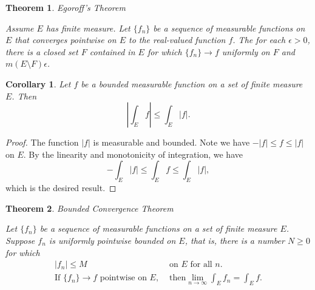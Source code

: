\documentclass[12pt]{amsart}
\theoremstyle{plain}
\newtheorem{thm}{Theorem}[section]
\newtheorem{cor}{Corollary}[thm]
\theoremstyle{definition}
\theoremstyle{remark}
\numberwithin{equation}{section}
\numberwithin{thm}{section}
\begin{document}
\begin{thm}{Egoroff's Theorem}\label{thm:Egoroff} %

    Assume $E$ has finite measure. Let $\{f_n\}$ be a sequence of measurable functions on $E$ that converges pointwise on $E$ to the real-valued function $f$. The for each $\epsilon>0$, there is a closed set $F$ contained in $E$ for which
    $\{f_n\} \to f$ uniformly on $F$ and $m(E \setminus F) \epsilon$. 
\end{thm}
\begin{cor}\label{cor:cor7Royden}
    Let $f$ be a bounded measurable function on a set of finite measure $E$. Then 
\begin{equation*}
    |\int_E f| \leq \int_E |f|.
\end{equation*}
\end{cor}
\begin{proof}
    The function $|f|$ is measurable and bounded. Note we have $-|f| \leq f \leq |f|$ on $E$. By the linearity and monotonicity of integration, we have
    \begin{equation*}
        -\int_E |f| \leq \int_E f \leq \int_E |f|,
    \end{equation*}
    which is the desired result.
\end{proof}
\begin{thm}{Bounded Convergence Theorem}\label{thm:bct}

Let $\{f_n\}$ be a sequence of measurable functions on a set of finite measure $E$. Suppose ${f_n}$ is uniformly pointwise bounded on $E$, that is, there is a number $N \geq 0$ for which 
\begin{equation*}
\begin{aligned}
    |f_n| \leq M  & \text{ on }E \text{ for all } n. \\
    \text{If } \{f_n\} \to f \text{ pointwise on }E, & \text{ then} \lim_{n \to \infty} \int_E f_n = \int_E f \text{.}
\end{aligned}    
\end{equation*}
\end{thm}
\end{document}
